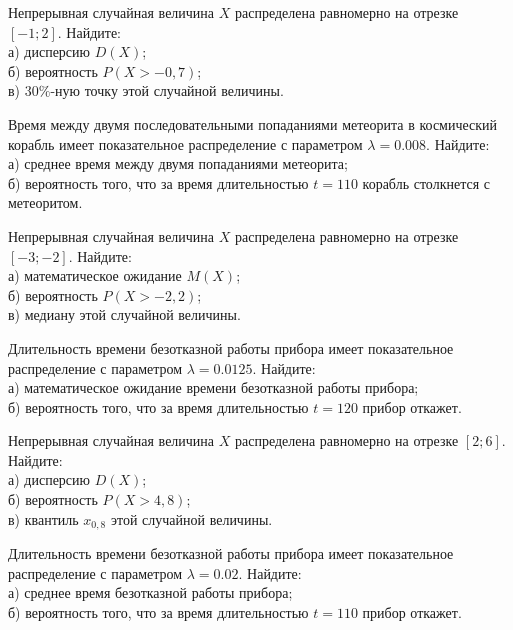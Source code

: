 \vfill

\newpage\setcounter{zad}{0}

\z Непрерывная случайная величина $X$ распределена равномерно на отрезке $[-1; 2]$. Найдите: \\ \quad а) дисперсию $D(X)$; \\ \quad б) вероятность $P(X>-0{,}7)$; \\ \quad в) $30\%$-ную точку этой случайной величины.


\vfill

\z Время между двумя последовательными попаданиями метеорита в космический корабль имеет показательное распределение с параметром $\lambda = 0.008$. Найдите: \\ \quad а) среднее время между двумя попаданиями метеорита; \\ \quad б) вероятность того, что за время длительностью $t = 110$ корабль  столкнется с метеоритом.
 

\vfill

\newpage\setcounter{zad}{0}

\z Непрерывная случайная величина $X$ распределена равномерно на отрезке $[-3; -2]$. Найдите: \\ \quad а) математическое ожидание $M(X)$; \\ \quad б) вероятность $P(X>-2{,}2)$; \\ \quad в) медиану этой случайной величины.


\vfill

\z Длительность времени безотказной работы прибора имеет показательное распределение с параметром $\lambda = 0.0125$. Найдите: \\ \quad а) математическое ожидание времени безотказной работы прибора; \\ \quad б) вероятность того, что за время длительностью $t = 120$ прибор  откажет.
 

\vfill

\newpage\setcounter{zad}{0}

\z Непрерывная случайная величина $X$ распределена равномерно на отрезке $[2; 6]$. Найдите: \\ \quad а) дисперсию $D(X)$; \\ \quad б) вероятность $P(X>4{,}8)$; \\ \quad в) квантиль $x_{0{,}8}$ этой случайной величины.


\vfill

\z Длительность времени безотказной работы прибора имеет показательное распределение с параметром $\lambda = 0.02$. Найдите: \\ \quad а) среднее время безотказной работы прибора; \\ \quad б) вероятность того, что за время длительностью $t = 110$ прибор  откажет.
 

